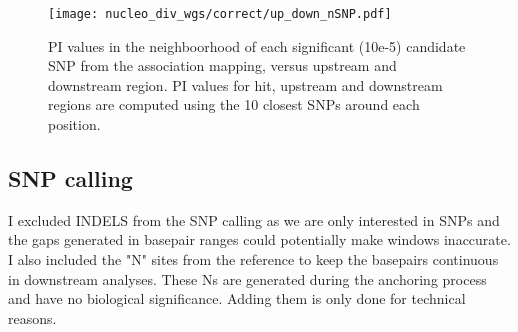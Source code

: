 \documentclass[10pt,a4paper]{report}
\begin{document}
\begin{figure}
\texttt{[image: nucleo\_div\_wgs/correct/up\_down\_nSNP.pdf]}
\caption{PI values in the neighboorhood of each significant (10e-5) candidate  SNP from the association mapping, versus upstream and downstream region. PI values for hit, upstream and downstream regions are computed using the 10 closest SNPs around each position.}
\label{up_down_nSNP}
\end{figure}

\subsection{SNP calling}
I excluded INDELS from the SNP calling as we are only interested in SNPs and the gaps generated in basepair ranges could potentially make windows inaccurate. I also included the "N" sites from the reference to keep the basepairs continuous in downstream analyses. These Ns are generated during the anchoring process and have no biological significance. Adding them is only done for technical reasons.
\end{document}
